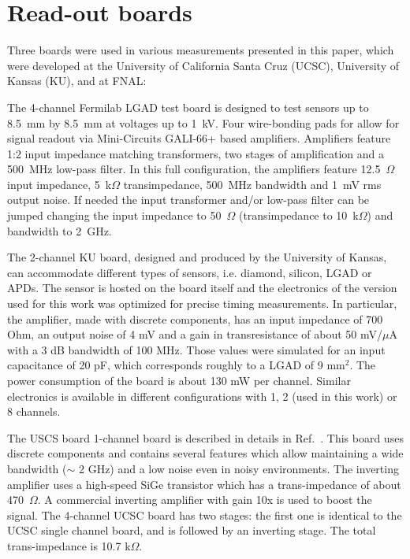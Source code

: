 \documentclass[preprint,1p]{elsarticle}
\begin{document}
\section{Read-out boards}
\label{sec:boards}

Three boards were used in various measurements presented in this paper, which
were developed at the University of California Santa Cruz (UCSC), University of
Kansas (KU), and at FNAL:

The 4-channel Fermilab LGAD test board is designed to test sensors up to 8.5~mm
by 8.5~mm at voltages up to 1~kV. Four wire-bonding pads for allow for signal
readout via Mini-Circuits GALI-66+ based amplifiers. Amplifiers feature 1:2
input impedance matching transformers, two stages of amplification and a 500~MHz
low-pass filter. In this full configuration, the amplifiers feature
12.5~$\Omega$ input impedance, 5~k$\Omega$ transimpedance, 500~MHz bandwidth and
1~mV rms output noise. If needed the input transformer and/or low-pass filter
can be jumped changing the input impedance to 50~$\Omega$ (transimpedance to
10~k$\Omega$) and bandwidth to 2~GHz.

The 2-channel KU board, designed and produced by the University of Kansas, can
accommodate different types of sensors, i.e. diamond, silicon, LGAD or APDs. The
sensor is hosted on the board itself and the electronics of the version used for
this work was optimized for precise timing measurements. In particular, the
amplifier, made with discrete components, has an input impedance of 700 Ohm, an
output noise of 4 mV and a gain in transresistance of about 50 mV/$\mu$A with
a 3 dB bandwidth of 100 MHz. Those values were simulated for an input
capacitance of 20 pF, which corresponds roughly to a LGAD of 9 mm$^2$. The power
consumption of the board is about 130 mW per channel. Similar electronics is
available in different configurations with 1, 2 (used in this work) or 8
channels.

The USCS board 1-channel board is described in details in
Ref.~\cite{Cartiglia201783}. This board uses discrete components and contains
several features which allow maintaining a wide bandwidth ($\sim$ 2 GHz) and a
low noise even in noisy environments. The inverting amplifier uses a high-speed
SiGe transistor which has a trans-impedance of about 470~$\Omega$. A commercial
inverting amplifier with gain 10x is used to boost the signal. The 4-channel
UCSC board has two stages: the first one is identical to the UCSC single channel
board, and is followed by an inverting stage. The total trans-impedance is 10.7
k$\Omega$.
\end{document}
